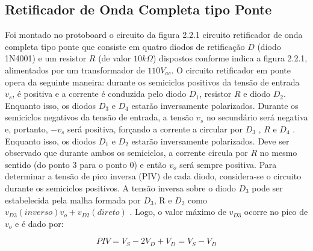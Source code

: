 \documentclass[a4paper]{article} %
\begin{document}
 \subsection{ Retificador de Onda Completa tipo Ponte}
         Foi montado no protoboard o circuito da figura 2.2.1 circuito retificador de onda completa tipo ponte que consiste em quatro diodos de retificação $D$ (diodo 1N4001) e um resistor $R$    (de valor $10k\Omega$) dispostos conforme indica a figura 2.2.1, alimentados por um transformador de $110V_{ac}$.
         O circuito retificador em ponte opera da seguinte maneira: durante os semiciclos positivos da tensão de entrada $v_s$, é positiva e a corrente é conduzida pelo diodo $D_1$, resistor $R$ e diodo $D_2$. Enquanto isso, os diodos  $D_3$      e $D_4$   estarão inversamente polarizados. Durante os semiciclos negativos da tensão de entrada, a tensão $v_s$ no secundário será negativa e, portanto,  $-v_s$     será positiva, forçando a corrente a circular por $D_3$ , $R$ e $D_4$ . Enquanto isso, os diodos $D_1$ e $D_2$   estarão inversamente polarizados.
         Deve ser observado que durante ambos os semiciclos, a corrente circula por $R$ no mesmo sentido (do ponto 3 para o ponto 0) e então   $v_o$    será sempre positiva.
         Para determinar a tensão de pico inversa (PIV) de cada diodo, considera-se o circuito durante os semiciclos positivos. A tensão inversa sobre o diodo $D_3$ pode ser estabelecida pela malha formada por $D_3$, R e $D_2$         como  $v_{D3}(inverso)v_o+v_{D2}(direto)$ . Logo, o valor máximo de $v_{D3}$     ocorre no pico de $v_o$    e é dado por:
                                    
\begin{equation}
PIV=V_S-2V_D+V_D=V_S-V_D
\end{equation}
\end{document}
